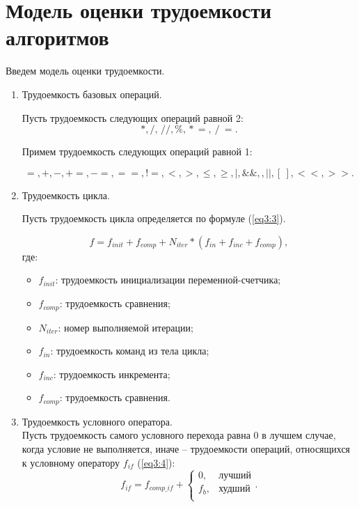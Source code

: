 \newpage
\section{Модель оценки трудоемкости алгоритмов}
Введем модель оценки трудоемкости.

\begin{enumerate}
	\item Трудоемкость базовых операций.
	
	Пусть трудоемкость следующих операций равной 2: 
	$$
	\label{eq3:1}
	*, /, \, //, \%, \mathrel{*}=, \mathrel{/}=.
	$$
	
	Примем трудоемкость следующих операций равной 1:
	
	$$
	\label{eq3:2}
	=, +, -, +=, -=, ==, \mathrel{!}=, <, >, \leq, \geq, |, \&\&,, ||, [\ ], <<, >>.
	$$
	
	\item Трудоемкость цикла.
	
	Пусть трудоемкость цикла определяется по формуле (\ref{eq3:3}).
	
	\begin{equation}
		\label{eq3:3} 
		f = f_{init} + f_{comp} + N_{iter} * (f_{in} + f_{inc} + f_{comp}),
	\end{equation} 
	где:
	\begin{itemize}
		\item $f_{init}$: трудоемкость инициализации переменной-счетчика;
		\item $f_{comp}$: трудоемкость сравнения;
		\item $N_{iter}$: номер выполняемой итерации;
		\item $f_{in}$: трудоемкость команд из тела цикла;
		\item $f_{inc}$: трудоемкость инкремента;
		\item $f_{comp}$: трудоемкость сравнения.
	\end{itemize}
	\item Трудоемкость условного оператора. \\
	Пусть трудоемкость самого условного перехода равна 0 в лучшем случае, когда условие не выполняется, иначе -- трудоемкости операций, относящихся к условному оператору $f_{if}$ (\ref{eq3:4}): 
	\begin{equation}
		\label{eq3:4}
		f_{if} = f_{comp\_if} +
		\begin{cases}
			0, & \text{лучший}\\
			f_{b}, & \text{худший}\\
		\end{cases}.
	\end{equation}
	
\end{enumerate}


